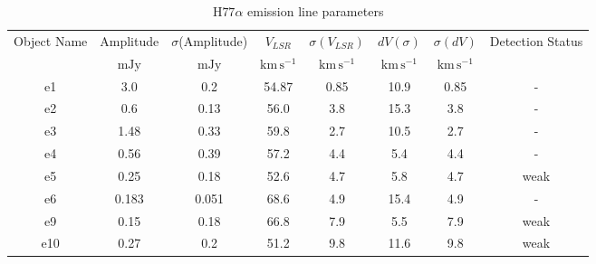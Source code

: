 \begin{table*}[htp]
\caption{H$77\alpha$ emission line parameters}
\begin{tabular}{cccccccc}
\label{tab:h77a}
Object Name & Amplitude & $\sigma$(Amplitude) & $V_{LSR}$ & $\sigma(V_{LSR})$ & $dV (\sigma)$ & $\sigma(dV)$ & Detection Status \\
 & $\mathrm{mJy}$ & $\mathrm{mJy}$ & $\mathrm{km\,s^{-1}}$ & $\mathrm{km\,s^{-1}}$ & $\mathrm{km\,s^{-1}}$ & $\mathrm{km\,s^{-1}}$ &  \\
\hline
e1 & 3.0 & 0.2 & 54.87 & 0.85 & 10.9 & 0.85 & - \\
e2 & 0.6 & 0.13 & 56.0 & 3.8 & 15.3 & 3.8 & - \\
e3 & 1.48 & 0.33 & 59.8 & 2.7 & 10.5 & 2.7 & - \\
e4 & 0.56 & 0.39 & 57.2 & 4.4 & 5.4 & 4.4 & - \\
e5 & 0.25 & 0.18 & 52.6 & 4.7 & 5.8 & 4.7 & weak \\
e6 & 0.183 & 0.051 & 68.6 & 4.9 & 15.4 & 4.9 & - \\
e9 & 0.15 & 0.18 & 66.8 & 7.9 & 5.5 & 7.9 & weak \\
e10 & 0.27 & 0.2 & 51.2 & 9.8 & 11.6 & 9.8 & weak \\
\hline
\end{tabular}
\end{table*}
